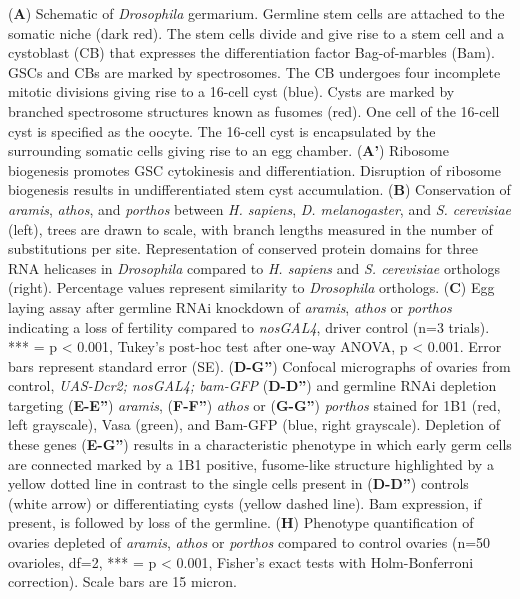 \documentclass[12pt,oneside]{reedthesis}
\begin{document}
\setlength\parindent{0pt}(\textbf{A}) Schematic of \emph{Drosophila} germarium. Germline stem cells are attached to the somatic niche (dark red). The stem cells divide and give rise to a stem cell and a cystoblast (CB) that expresses the differentiation factor Bag-of-marbles (Bam). GSCs and CBs are marked by spectrosomes. The CB undergoes four incomplete mitotic divisions giving rise to a 16-cell cyst (blue). Cysts are marked by branched spectrosome structures known as fusomes (red). One cell of the 16-cell cyst is specified as the oocyte. The 16-cell cyst is encapsulated by the surrounding somatic cells giving rise to an egg chamber. (\textbf{A'}) Ribosome biogenesis promotes GSC cytokinesis and differentiation. Disruption of ribosome biogenesis results in undifferentiated stem cyst accumulation. (\textbf{B}) Conservation of \emph{aramis}, \emph{athos}, and \emph{porthos} between \emph{H. sapiens}, \emph{D. melanogaster}, and \emph{S. cerevisiae} (left), trees are drawn to scale, with branch lengths measured in the number of substitutions per site. Representation of conserved protein domains for three RNA helicases in \emph{Drosophila} compared to \emph{H. sapiens} and \emph{S. cerevisiae} orthologs (right). Percentage values represent similarity to \emph{Drosophila} orthologs. (\textbf{C}) Egg laying assay after germline RNAi knockdown of \emph{aramis}, \emph{athos} or \emph{porthos} indicating a loss of fertility compared to \emph{nosGAL4}, driver control (n=3 trials). *** = p \textless{} 0.001, Tukey's post-hoc test after one-way ANOVA, p \textless{} 0.001. Error bars represent standard error (SE). (\textbf{D-G''}) Confocal micrographs of ovaries from control, \emph{UAS-Dcr2; nosGAL4; bam-GFP} (\textbf{D-D''}) and germline RNAi depletion targeting (\textbf{E-E''}) \emph{aramis}, (\textbf{F-F''}) \emph{athos} or (\textbf{G-G''}) \emph{porthos} stained for 1B1 (red, left grayscale), Vasa (green), and Bam-GFP (blue, right grayscale). Depletion of these genes (\textbf{E-G''}) results in a characteristic phenotype in which early germ cells are connected marked by a 1B1 positive, fusome-like structure highlighted by a yellow dotted line in contrast to the single cells present in (\textbf{D-D''}) controls (white arrow) or differentiating cysts (yellow dashed line). Bam expression, if present, is followed by loss of the germline. (\textbf{H}) Phenotype quantification of ovaries depleted of \emph{aramis}, \emph{athos} or \emph{porthos} compared to control ovaries (n=50 ovarioles, df=2, *** = p \textless{} 0.001, Fisher's exact tests with Holm-Bonferroni correction). Scale bars are 15 micron.
\end{document}

